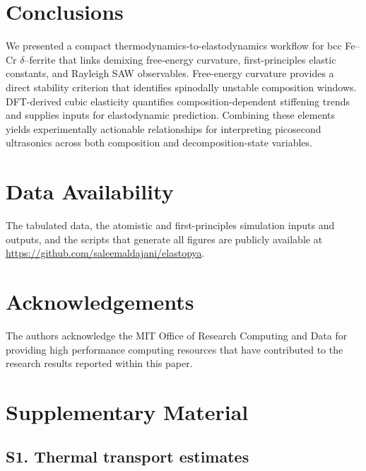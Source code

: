 \documentclass[final,3p,times]{elsarticle}
\begin{document}
\section{Conclusions}
We presented a compact thermodynamics-to-elastodynamics workflow for bcc Fe--Cr $\delta$--ferrite that links demixing free-energy curvature, first-principles elastic constants, and Rayleigh SAW observables. Free-energy curvature provides a direct stability criterion that identifies spinodally unstable composition windows. DFT-derived cubic elasticity quantifies composition-dependent stiffening trends and supplies inputs for elastodynamic prediction. Combining these elements yields experimentally actionable relationships for interpreting picosecond ultrasonics across both composition and decomposition-state variables.

\section*{Data Availability}
The tabulated data, the atomistic and first-principles simulation inputs and outputs, and the scripts that generate all figures are publicly available at \url{https://github.com/saleemaldajani/elastopya}.


\section*{Acknowledgements}
The authors acknowledge the MIT Office of Research Computing and Data for providing high performance computing resources that have contributed to the research results reported within this paper.





\newpage
\clearpage

\section*{Supplementary Material}

\setcounter{figure}{0}
\renewcommand{\thefigure}{S\arabic{figure}}
\renewcommand{\thetable}{S\arabic{table}}
\renewcommand{\theequation}{S\arabic{equation}}
\setcounter{equation}{0}

\subsection*{S1. Thermal transport estimates}
\end{document}
